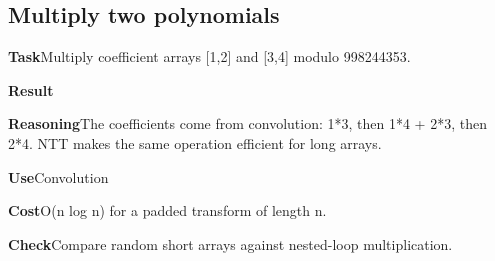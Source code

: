 \documentclass[10pt,letterpaper]{article}
\newcommand{\entrylabel}[1]{\textcolor{accent}{\bfseries #1}}
\begin{document}
\subsection*{Multiply two polynomials}
\noindent\entrylabel{Task}\quad Multiply coefficient arrays [1,2] and [3,4] modulo 998244353.\par
\noindent\entrylabel{Result}\quad [3,10,8]\par
\noindent\entrylabel{Reasoning}\quad The coefficients come from convolution: 1*3, then 1*4 + 2*3, then 2*4. NTT makes the same operation efficient for long arrays.\par
\noindent\entrylabel{Use}\quad Convolution\par
\noindent\entrylabel{Cost}\quad O(n log n) for a padded transform of length n.\par
\noindent\entrylabel{Check}\quad Compare random short arrays against nested-loop multiplication.\par
\end{document}
